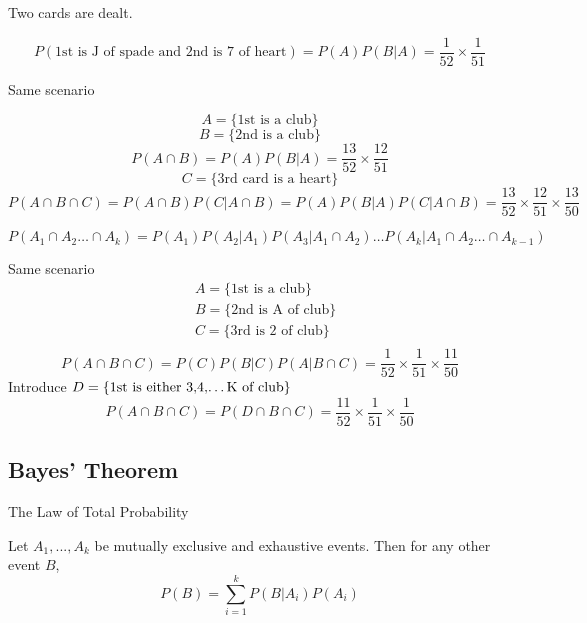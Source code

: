 \begin{exmp}
Two cards are dealt.

\[P(\text{1st is J of spade and 2nd is 7 of heart})=P(A)P(B|A)=\frac{1}{52} \times \frac{1}{51}\]
\end{exmp}

\begin{exmp}
Same scenario

\[ A=\{\text{1st is a club}\} \]
\[ B=\{\text{2nd is a club}\}\]
\[P(A\cap B)=P(A)P(B|A)=\frac{13}{52} \times \frac{12}{51}\]
\[C=\{\text{3rd card is a heart}\} \]
\[P(A \cap B\cap C)=P(A\cap B)P(C|A \cap B)=P(A)P(B|A)P(C|A \cap B)=\frac{13}{52} \times \frac{12}{51} \times \frac{13}{50}\]
\end{exmp}

\begin{prop}
\[P(A_1 \cap A_2 \dots \cap A_k)=P(A_1)P(A_2|A_1)P(A_3|A_1\cap A_2)\dots P(A_k|A_1\cap A_2\dots\cap A_{k-1})\]
\end{prop}

\begin{exmp}
Same scenario
\begin{align*}
& A=\{\text{1st is a club}\} \\
& B=\{\text{2nd is A of club}\} \\
& C=\{\text{3rd is 2 of club}\} \\
\end{align*}
\[ P(A \cap B\cap C)=P(C)P(B|C)P(A|B\cap C)=\frac{1}{52}\times\frac{1}{51}\times\frac{11}{50} \]
Introduce $D=\{\text{1st is either 3,4,\dots K of club}\}$
\[P(A \cap B\cap C)=P(D\cap B\cap C)=\frac{11}{52}\times\frac{1}{51}\times\frac{1}{50}\]
\end{exmp}

\subsection{Bayes' Theorem}
\begin{theo}
  The Law of Total Probability

  Let $A_1, . . . , A_k$ be mutually exclusive and exhaustive events. Then for any other event $B$,
  \[ P(B)=\sum_{i=1}^{k} P(B|A_i)P(A_i)\]
\end{theo}

